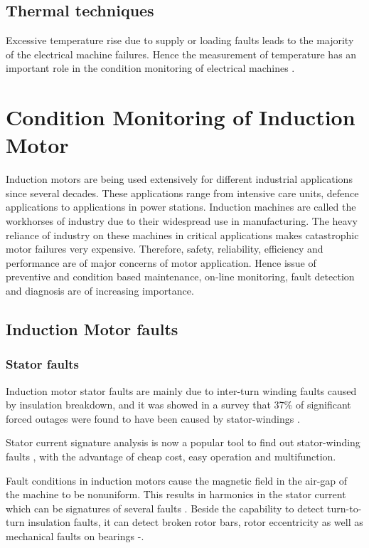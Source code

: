 \documentclass[a4paper,11pt]{report}
\begin{document}
\subsection*{Thermal techniques}
Excessive temperature rise due to supply or loading faults leads to the majority of the electrical machine failures. Hence the measurement of temperature has an important role in the condition monitoring of electrical machines \cite{rps6}.

\section{Condition Monitoring of Induction Motor}
Induction motors are being used extensively for different industrial applications since several decades. These applications range from intensive care units, defence applications to applications in power stations. Induction machines are called the workhorses of industry due to their widespread use in manufacturing. The heavy reliance of industry on these machines in critical applications makes catastrophic motor failures very expensive. Therefore, safety, reliability,  efficiency and performance are of major concerns of motor application. Hence issue of preventive and condition based maintenance, on-line monitoring, fault detection and diagnosis are of increasing importance.

\subsection{Induction Motor faults}
\subsubsection*{Stator faults}
Induction motor stator faults are mainly due to inter-turn winding faults caused by insulation breakdown, and it was showed in a survey that 37\% of significant forced outages were found to have been caused by stator-windings \cite{40}.

Stator current signature analysis is now a popular tool to find out stator-winding faults \cite{53},\cite{55} with the advantage of cheap cost, easy operation and multifunction. 

Fault conditions in induction motors cause the magnetic field in the air-gap of the machine to be nonuniform. This results in harmonics in the stator current which can be signatures of several faults \cite{56}. Beside the capability to detect turn-to-turn insulation faults, it can detect broken rotor bars, rotor eccentricity as well as mechanical faults on bearings \cite{57}-\cite{59}.
\end{document}
